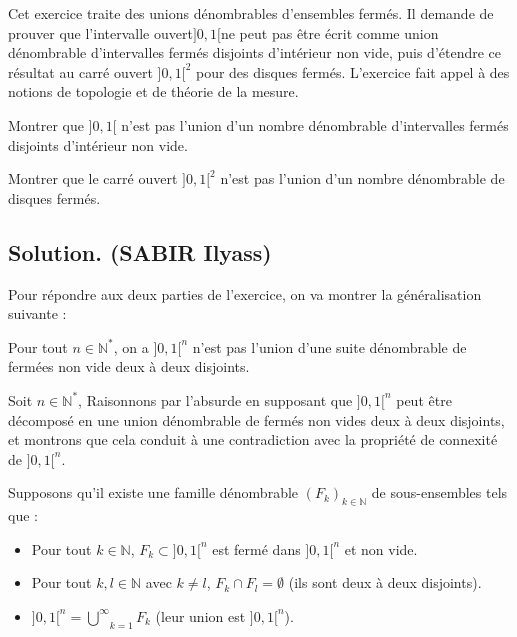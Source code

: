 Cet exercice traite des unions d{\'e}nombrables d'ensembles ferm{\'e}s. Il
demande de prouver que l'intervalle ouvert$] 0, 1 [$ne peut pas {\^e}tre
{\'e}crit comme union d{\'e}nombrable d'intervalles ferm{\'e}s disjoints
d'int{\'e}rieur non vide, puis d'{\'e}tendre ce r{\'e}sultat au carr{\'e}
ouvert ]$0, 1 [^2$ pour des disques ferm{\'e}s. L'exercice fait appel {\`a}
des notions de topologie et de th{\'e}orie de la mesure.

\begin{exercise}
Montrer que $] 0, 1 [$ n'est pas l'union d'un nombre d{\'e}nombrable
d'intervalles ferm{\'e}s disjoints d'int{\'e}rieur non vide.

Montrer que le carr{\'e} ouvert $] 0, 1 [^2$ n'est pas l'union d'un nombre
d{\'e}nombrable de disques ferm{\'e}s.
\end{exercise}
\subsection*{Solution. (SABIR Ilyass)}

Pour r{\'e}pondre aux deux parties de l'exercice, on va montrer la
g{\'e}n{\'e}ralisation suivante :


Pour tout $n \in \mathbb{N}^{\ast}$, on a $] 0, 1 [^n$ n'est pas l'union d'une
suite d{\'e}nombrable de ferm{\'e}es non vide deux {\`a} deux disjoints.

Soit $n \in \mathbb{N}^{\ast}$, Raisonnons par l'absurde en supposant que $]
0, 1 [^n$ peut {\^e}tre d{\'e}compos{\'e} en une union d{\'e}nombrable de
ferm{\'e}s non vides deux {\`a} deux disjoints, et montrons que cela conduit
{\`a} une contradiction avec la propri{\'e}t{\'e} de connexit{\'e} de $] 0, 1
[^n$.

Supposons qu'il existe une famille d{\'e}nombrable $(F_k)_{k \in \mathbb{N}}$
de sous-ensembles tels que :
\begin{itemize}
  \item Pour tout $k \in \mathbb{N}$, $F_k \subset] 0, 1 [^n$ est ferm{\'e}
  dans $] 0, 1 [^n$ et non vide.
  
  \item Pour tout $k, l \in \mathbb{N}$ avec $k \neq l$, $F_k \cap F_l =
  \emptyset$ (ils sont deux {\`a} deux disjoints).
  
  \item $] 0, 1 [^n = \underset{k = 1}{\overset{\infty}{\bigcup}} F_k$ (leur
  union est $] 0, 1 [^n$).
\end{itemize}


